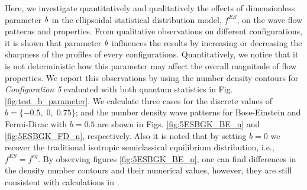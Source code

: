 \documentclass{rsproca}%
\begin{document}
Here, we investigate quantitatively and qualitatively the effects of dimensionless parameter $\it{b}$ in the ellipsoidal statistical distribution model, $f^{ES}$, on the wave flow patterns and properties.  From qualitative observations on different configurations, it is shown that parameter $\it{b}$ influences the results by increasing or decreasing the sharpness of the profiles of every configurations. Quantitatively, we notice that it is not deterministic how this parameter may affect the overall magnitude of flow properties. We report this observations by using the number density contours for \emph{Configuration 5} evaluated with both quantum statistics in Fig. \ref{fig:test_b_parameter}.  We calculate three cases for the discrete values of $b=\{-0.5,\;0,\;0.75\}$; and the number density wave patterns for Bose-Einstein and Fermi-Dirac with $b=0.5$ are shown in Figs. \ref{fig:5ESBGK_BE_n} and \ref{fig:5ESBGK_FD_n}, respectively. Also it is noted that by setting $b=0$ we recover the traditional isotropic semiclassical equilibrium distribution, i.e., $f^{ES}= f^{eq}$.  By observing figures \ref{fig:5ESBGK_BE_n}, one can find differences in the density number contours and their numerical values, however, they are still consistent with calculations in \cite{Laxliu95}\cite{schultzrinne}.
\end{document}
